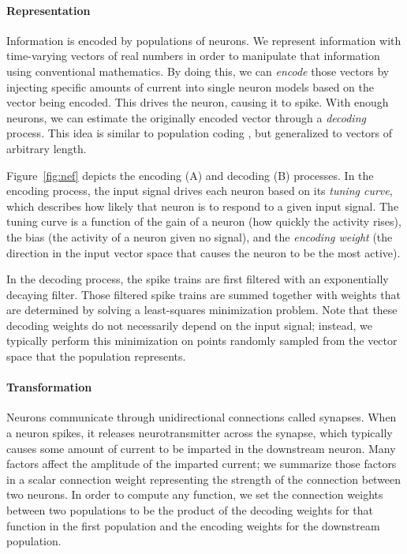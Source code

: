 \documentclass{frontiersSCNS}
\begin{document}
\paragraph{Representation}
Information is encoded by populations of neurons.
We represent information
with time-varying vectors of real numbers
in order to manipulate that information
using conventional mathematics.
By doing this, we can \textit{encode}
those vectors by injecting
specific amounts of current into
single neuron models based on
the vector being encoded.
This drives the neuron,
causing it to spike.
With enough neurons,
we can estimate the originally encoded vector
through a \textit{decoding} process.
This idea is similar to population coding
\cite{TODO}, but generalized
to vectors of arbitrary length.

Figure~\ref{fig:nef} depicts
the encoding (A) and decoding (B) processes.
In the encoding process, the input signal drives
each neuron based on its \textit{tuning curve},
which describes how likely
that neuron is to respond to a given input signal.
The tuning curve is a function of the gain
of a neuron (how quickly the activity rises),
the bias (the activity of a neuron given no signal),
and the \textit{encoding weight}
(the direction in the input vector space
that causes the neuron to be the most active).

In the decoding process,
the spike trains are first filtered
with an exponentially decaying filter.
Those filtered spike trains are summed together
with weights that are determined
by solving a least-squares minimization problem.
Note that these decoding weights
do not necessarily depend on the input signal;
instead, we typically perform
this minimization on points
randomly sampled from
the vector space
that the population represents.

\paragraph{Transformation}  %
Neurons communicate through
unidirectional connections called synapses.
When a neuron spikes,
it releases neurotransmitter across the synapse,
which typically causes some amount of current
to be imparted in the downstream neuron.
Many factors affect the
amplitude of the imparted current;
we summarize those factors
in a scalar connection weight
representing the strength
of the connection between two neurons.
In order to compute any function,
we set the connection weights between
two populations to be the product of
the decoding weights for that function
in the first population
and the encoding weights
for the downstream population.
\end{document}
